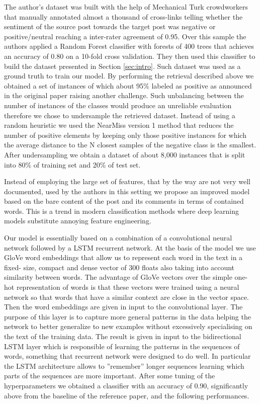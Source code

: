 \documentclass{article}
\begin{document}
The author's dataset was built with the help of Mechanical Turk crowdworkers
that manually annotated almost a thousand of cross-links telling whether the
sentiment of the source post towards the target post was negative or
positive/neutral reaching a inter-rater agreement of 0.95. Over this sample the
authors applied a Random Forest classifier with forests of 400 trees that
achieves an accuracy of 0.80 on a 10-fold cross validation. They then used this
classifier to build the dataset presented in Section \ref{sec:intro}. Such
dataset was used as a ground
truth to train our model. By performing the retrieval described above we
obtained a set of instances of which about 95\% labeled as positive as
announced in the original paper raising another challenge. Such unbalancing
between the number of
instances of the classes would produce an unreliable evaluation therefore we
chose to undersample the retrieved dataset. Instead of using a random heuristic
we used the NearMiss version 1 method that reduces the number of positive
elements by keeping only those positive instances for which the average distance
to the N closest samples of the negative class is the smallest. After
undersampling we obtain a dataset of about 8,000 instances that is split into
80\% of training set and 20\% of test set.

Instead of employing the large set of features, that by the way are not
very well documented, used by the authors in this setting we propose an improved
model based on the bare content of the post and its comments in terms of
contained words. This is a trend in modern classification methods
where deep learning models substitute annoying feature engineering.


Our model is essentially based on a combination of a convolutional
neural network followed by a LSTM recurrent network. At the basis of the model we
use GloVe word embeddings that allow us to represent each word in the text in a fixed-
size, compact and dense vector of 300 floats also taking into account similarity between
words. The advantage of GloVe vectors over the simple one-hot representation of words
is that these vectors were trained using a neural network so that words that have a
similar context are close in the vector space. Then the word embeddings are given in 
input to the convolutional layer. The purpose
of this layer is to capture more general patterns in the data helping the network to better
generalize to new examples without excessively specialising on the text of the training
data. The result is given in input to the bidirectional LSTM layer which is responsible
of learning the patterns in the sequences of words, something that recurrent network
were designed to do well. In particular the LSTM architecture allows to ”remember”
longer sequences learning which parts of the sequences are more important. After
some tuning of the hyperparameters we obtained a classifier with an accuracy of
0.90, significantly above from the baseline of the reference paper, and the
following performances.
\end{document}
